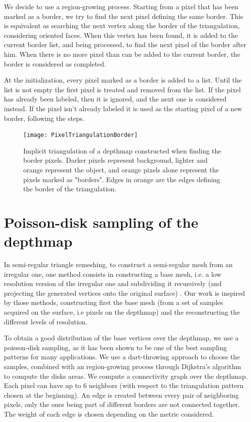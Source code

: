 \documentclass[11pt,fleqn]{book} %
\begin{document}
We decide to use a region-growing process. 
Starting from a pixel that has been marked as a border, we try to find the next pixel defining the same border. 
This is equivalent as searching the next vertex along the border of the triangulation, considering oriented faces.
When this vertex has been found, it is added to the current border list, and being processed, to find the next pixel of the border after him.
When there is no more pixel than can be added to the current border, the border is considered as completed.

At the initialization, every pixel marked as a border is added to a list. Until the list is not empty the first pixel is treated and removed from the list. 
If the pixel has already been labeled, then it is ignored, and the next one is considered instead. 
If the pixel isn't already labeled it is used as the starting pixel of a new border, following the steps.

\begin{figure}[ht]
\centering
\texttt{[image: PixelTriangulationBorder]}
\caption{Implicit triangulation of a depthmap constructed when finding the border pixels. Darker pixels represent background, lighter and orange represent the object, and orange pixels alone represent the pixels marked as "borders".
Edges in orange are the edges defining the border of the triangulation.}
\label{fig:border_triangulation}
\end{figure}

\section{Poisson-disk sampling of the depthmap}
\label{sec:poisson_sampling}

In semi-regular triangle remeshing, to construct a semi-regular mesh from an irregular one, one method consists in constructing a base mesh, i.e. a low resolution version of the irregular one and subdividing it recursively (and projecting the generated vertices onto the original surface) \cite{PRS15}. Our work is inspired by those methods, constructing first the base mesh (from a set of samples acquired on the surface, i.e pixels on the depthmap) and the reconstructing the different levels of resolution.

To obtain a good distribution of the base vertices over the depthmap, we use a poisson-disk sampling, as it has been shown to be one of the best sampling patterns for many applications. 
We use a dart-throwing approach to choose the samples, combined with an region-growing process through Dijkstra's algorithm \cite{Dij59} to compute the disks areas.
We compute a connectivity graph over the depthmap. Each pixel can have up to 6 neighbors (with respect to the triangulation pattern chosen at the beginning).
An edge is created between every pair of neighboring pixels, only the ones being part of different borders are not connected together. 
The weight of each edge is chosen depending on the metric considered.
\end{document}
